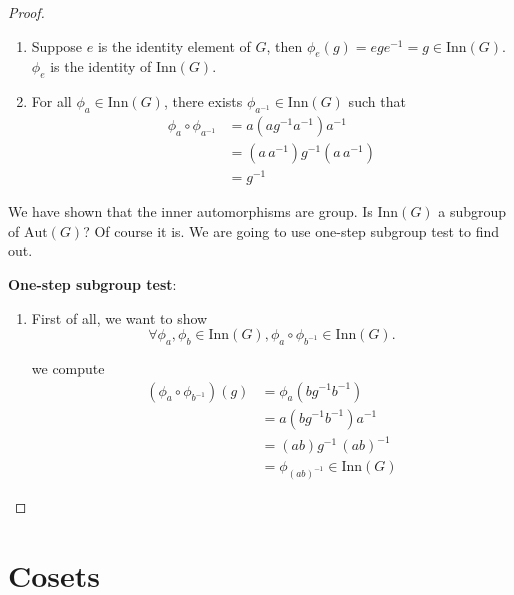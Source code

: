 \begin{proof}
\begin{enumerate}
        \item Suppose $e$ is the identity element of $G$, then $\phi_e(g) = ege^{-1} = g \in \text{Inn}(G)$. $\phi_e$ is the 
        identity of $\text{Inn}(G)$.

        \item For all $\phi_a \in \text{Inn}(G)$, there exists $\phi_{a^{-1}} \in \text{Inn}(G)$ such that 
        \begin{align*}
            \phi_a \circ \phi_{a^{-1}} &= a(a g^{-1} a^{-1})a^{-1}\\
            &= (a\,a^{-1}) g^{-1} (a\,a^{-1})\\
            &= g^{-1}
        \end{align*}
    \end{enumerate}

    We have shown that the inner automorphisms are group. Is $\text{Inn}(G)$ a subgroup of $\text{Aut}(G)$? Of course it is. We 
    are going to use one-step subgroup test to find out.

    \textbf{One-step subgroup test}:

    \begin{enumerate}
        \item First of all, we want to show 
        \[
            \forall \phi_a, \phi_b \in \text{Inn}(G), \phi_a \circ \phi_{b^{-1}} \in \text{Inn}(G).
        \]

        we compute
        \begin{align*}
            (\phi_a \circ \phi_{b^{-1}})(g) &= \phi_a (b g^{-1}b^{-1})\\
            &= a(b g^{-1}b^{-1})a^{-1}\\
            &= (ab)g^{-1}\,(ab)^{-1}\\
            &= \phi_{(ab)^{-1}} \in \text{Inn}(G)
        \end{align*}
    \end{enumerate}
\end{proof}

\section{Cosets}

